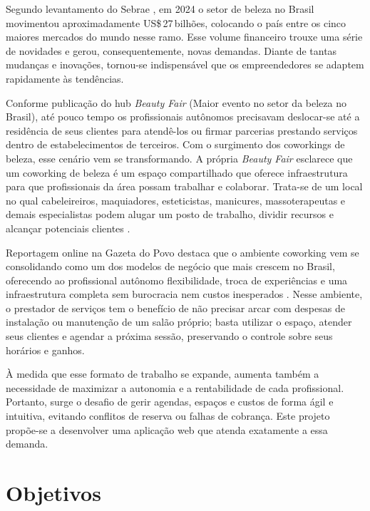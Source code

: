 
Segundo levantamento do Sebrae \cite{Sebrae_2025}
, em 2024 o setor de beleza no Brasil movimentou aproximadamente US\$\,27\,bilhões, colocando o país entre os cinco maiores mercados do mundo nesse ramo. Esse volume financeiro trouxe uma série de novidades e gerou, consequentemente, novas demandas. Diante de tantas mudanças e inovações, tornou-se indispensável que os empreendedores se adaptem rapidamente às tendências.

Conforme publicação do hub \emph{Beauty Fair} (Maior evento no setor da beleza no Brasil), até pouco tempo os profissionais autônomos precisavam deslocar-se até a residência de seus clientes para atendê-los ou firmar parcerias prestando serviços dentro de estabelecimentos de terceiros. Com o surgimento dos coworkings de beleza, esse cenário vem se transformando. A própria \emph{Beauty Fair} esclarece que um coworking de beleza é um espaço compartilhado que oferece infraestrutura para que profissionais da área possam trabalhar e colaborar. Trata-se de um local no qual cabeleireiros, maquiadores, esteticistas, manicures, massoterapeutas e demais especialistas podem alugar um posto de trabalho, dividir recursos e alcançar potenciais clientes \cite{BeautyFair}.

Reportagem online na Gazeta do Povo destaca que o ambiente coworking vem se consolidando como um dos modelos de negócio que mais crescem no Brasil, oferecendo ao profissional autônomo flexibilidade, troca de experiências e uma infraestrutura completa sem burocracia nem custos inesperados \cite{gazeta-coworking}. Nesse ambiente, o prestador de serviços tem o benefício de não precisar arcar com despesas de instalação ou manutenção de um salão próprio; basta utilizar o espaço, atender seus clientes e agendar a próxima sessão, preservando o controle sobre seus horários e ganhos.

À medida que esse formato de trabalho se expande, aumenta também a necessidade de maximizar a autonomia e a rentabilidade de cada profissional. Portanto, surge o desafio de gerir agendas, espaços e custos de forma ágil e intuitiva, evitando conflitos de reserva ou falhas de cobrança. Este projeto propõe-se a desenvolver uma aplicação web que atenda exatamente a essa demanda.

\section{Objetivos}

